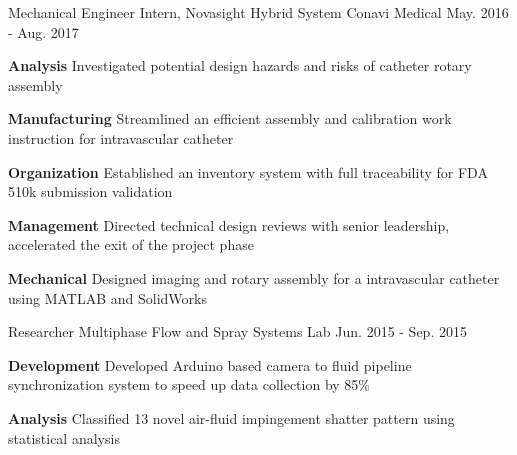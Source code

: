 \begin{cventries}
{\begin{cvitems}
		\end{cvitems}
	}
	\cventry
	{Mechanical Engineer Intern, Novasight Hybrid System}
	{Conavi Medical} 
	{May. 2016 - Aug. 2017}
	{}
	{
		\begin{cvitems}
			\item {
				\textbf{Analysis} Investigated potential design hazards and risks of catheter rotary assembly
			}
			\item {
				\textbf{Manufacturing} Streamlined an efficient assembly and calibration work instruction for intravascular catheter}
			\item {
				\textbf{Organization} Established an inventory system with full traceability for FDA 510k submission validation}
			\item {
				\textbf{Management} Directed technical design reviews with senior leadership, accelerated the exit of the project phase}
			\item {
				\textbf{Mechanical} Designed imaging and rotary assembly for a intravascular catheter using MATLAB and SolidWorks
			}
		\end{cvitems}
	}
	\cventry
	{Researcher}
	{Multiphase Flow and Spray Systems Lab} 
	{Jun. 2015 - Sep. 2015}
	{}
	{
		\begin{cvitems}
			\item {
				\textbf{Development} Developed Arduino based camera to fluid pipeline synchronization system to speed up data collection by 85\%
			}
			\item {
				\textbf{Analysis} Classified 13 novel air-fluid impingement shatter pattern using statistical analysis}
		\end{cvitems}
	}  
\end{cventries}
